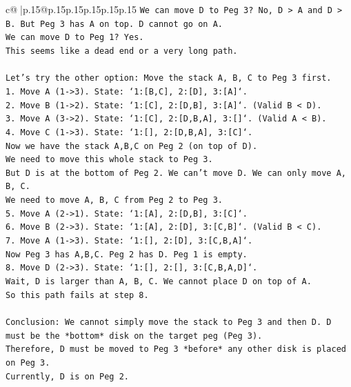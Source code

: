 \documentclass{article}
\begin{document}
{\begin{supertabular}{c@{$\;$}|p{.15\linewidth}@{}p{.15\linewidth}p{.15\linewidth}p{.15\linewidth}p{.15\linewidth}p{.15\linewidth}}
{{{\texttt{We can move D to Peg 3? No, D > A and D > B. But Peg 3 has A on top. D cannot go on A.} \\
\texttt{We can move D to Peg 1? Yes.} \\
\texttt{This seems like a dead end or a very long path.} \\
\\ 
\texttt{Let's try the other option: Move the stack A, B, C to Peg 3 first.} \\
\texttt{1. Move A (1{-}>3). State: `1:{[}B,C{]}, 2:{[}D{]}, 3:{[}A{]}`.} \\
\texttt{2. Move B (1{-}>2). State: `1:{[}C{]}, 2:{[}D,B{]}, 3:{[}A{]}`. (Valid B < D).} \\
\texttt{3. Move A (3{-}>2). State: `1:{[}C{]}, 2:{[}D,B,A{]}, 3:{[}{]}`. (Valid A < B).} \\
\texttt{4. Move C (1{-}>3). State: `1:{[}{]}, 2:{[}D,B,A{]}, 3:{[}C{]}`.} \\
\texttt{Now we have the stack A,B,C on Peg 2 (on top of D).} \\
\texttt{We need to move this whole stack to Peg 3.} \\
\texttt{But D is at the bottom of Peg 2. We can't move D. We can only move A, B, C.} \\
\texttt{We need to move A, B, C from Peg 2 to Peg 3.} \\
\texttt{5. Move A (2{-}>1). State: `1:{[}A{]}, 2:{[}D,B{]}, 3:{[}C{]}`.} \\
\texttt{6. Move B (2{-}>3). State: `1:{[}A{]}, 2:{[}D{]}, 3:{[}C,B{]}`. (Valid B < C).} \\
\texttt{7. Move A (1{-}>3). State: `1:{[}{]}, 2:{[}D{]}, 3:{[}C,B,A{]}`.} \\
\texttt{Now Peg 3 has A,B,C. Peg 2 has D. Peg 1 is empty.} \\
\texttt{8. Move D (2{-}>3). State: `1:{[}{]}, 2:{[}{]}, 3:{[}C,B,A,D{]}`.} \\
\texttt{Wait, D is larger than A, B, C. We cannot place D on top of A.} \\
\texttt{So this path fails at step 8.} \\
\\ 
\texttt{Conclusion: We cannot simply move the stack to Peg 3 and then D. D must be the *bottom* disk on the target peg (Peg 3).} \\
\texttt{Therefore, D must be moved to Peg 3 *before* any other disk is placed on Peg 3.} \\
\texttt{Currently, D is on Peg 2.} \\
}}}
\end{supertabular}}
\end{document}
